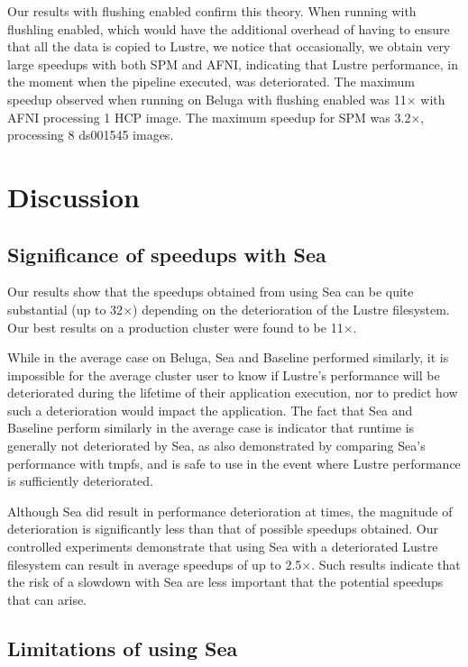   Our results with flushing enabled confirm this theory. When running with flushling enabled,
  which would have the additional overhead of having to ensure that all the data is copied to
  Lustre, we notice that occasionally, we obtain very large speedups with both SPM 
  and AFNI, indicating that Lustre performance, in the moment when the pipeline executed, was deteriorated.
  The maximum speedup observed when running on Beluga with flushing enabled was 11$\times$ with AFNI 
  processing 1 HCP image. The maximum speedup for SPM was 3.2$\times$, processing 8 ds001545 images.

    
    \section{Discussion}
    \subsection{Significance of speedups with Sea}

    Our results show that the speedups obtained from
    using Sea can be quite substantial (up to 32$\times$)
    depending on the deterioration of the Lustre
    filesystem. Our best results on a production cluster were found to be
    11$\times$.

    While in the average case on Beluga, Sea and Baseline performed similarly, it is
    impossible for the average cluster user to know if Lustre's performance will
    be deteriorated during the lifetime of their application execution,
    nor to predict how such a deterioration would impact the
    application. The fact that Sea and Baseline perform similarly in the
    average case is indicator that runtime is generally not deteriorated by Sea,
    as also demonstrated by comparing Sea's performance with tmpfs, 
    and is safe to use in the event where Lustre performance is sufficiently
    deteriorated.

    Although Sea did result in performance deterioration at times, the
    magnitude of deterioration is significantly less than that of possible
    speedups obtained. Our controlled experiments demonstrate that using
    Sea with a deteriorated Lustre filesystem can result in average
    speedups of up to 2.5$\times$. Such results indicate that the risk of a
    slowdown with Sea are less important that the potential speedups that
    can arise.

    \subsection{Limitations of using Sea}
    
